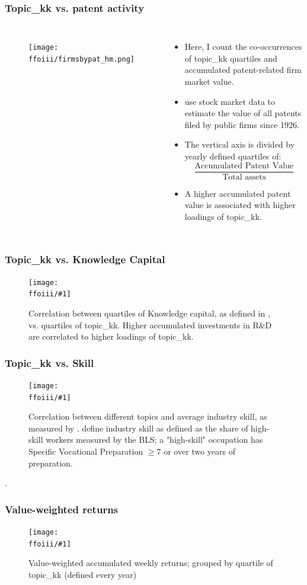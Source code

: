 \documentclass{beamer}
\newcommand{\ffoiii}{dicfullmc10thr10defnob5noa0_8_3t}
\newcommand{\insertfigureiii}[2]{
\begin{figure}[h!]
  \centering
  \texttt{[image: \\ffoiii/\#1]}
  \centering
  \captionsetup{font=scriptsize}
  \caption{#2}
  \label{fig:#1}
\end{figure}
}
\begin{document}
\begin{frame}
\frametitle{Topic\_kk vs. patent activity}
       \begin{columns}
             \begin{figure}[h!]
		  \centering
		  \texttt{[image: \\ffoiii/firmsbypat\_hm.png]}
		  \captionsetup{font=scriptsize}
		  \label{fig:firmsbypathm}
			\end{figure}
          \scriptsize
              \begin{itemize}
              \item Here, I count the co-occurrences of topic\_kk quartiles and accumulated patent-related firm market value.
              \item \cite{Kogan2017-fx} use stock market data to estimate the value of all patents filed by public firms since 1926.
			  \item The vertical axis is divided by yearly defined quartiles of:
			  \begin{equation}
  				\frac{\text{Accumulated Patent Value}}{\text{Total assets}}
				\end{equation}
			  \item A higher accumulated patent value is associated with higher loadings of topic\_kk.
			\end{itemize}
	  \end{columns} 
\end{frame}

\begin{frame}
\frametitle{Topic\_kk vs. Knowledge Capital}
\scriptsize
\insertfigureiii{topicvskkpt_hm}{Correlation between quartiles of Knowledge capital,  as defined in \cite{Peters2017-fl}, vs. quartiles of topic\_kk. Higher accumulated investments in R\&D are correlated to higher loadings of topic\_kk.}
\end{frame}

\begin{frame}
\frametitle{Topic\_kk vs. Skill}
\scriptsize
\insertfigureiii{heatmap}{Correlation between different topics and average industry skill, as measured by \cite{Belo2017-qi}. \cite{Belo2017-qi} define industry skill as defined as the share of high-skill workers measured by the BLS; a "high-skill" occupation has Specific Vocational Preparation $\geq 7$ or over two years of preparation.}. 
\end{frame}

\begin{frame}
\frametitle{Value-weighted returns}

\insertfigureiii{awawr}{Value-weighted accumulated weekly returns; grouped by quartile of topic\_kk (defined every year)}
\end{frame}
\end{document}
